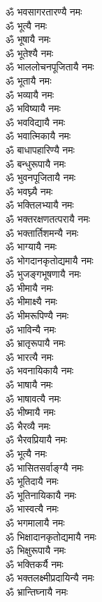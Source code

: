 \begin{flushleft}
\begin{multicols}{2}
ॐ भवसागरतारण्यै नमः\\
ॐ भूत्यै नमः\\
ॐ भूषायै नमः\hfill{}\\
ॐ भूतेश्यै नमः\\
ॐ भाललोचनपूजितायै नमः\\
ॐ भूतायै नमः\\
ॐ भव्यायै नमः\\
ॐ भविष्यायै नमः\\
ॐ भवविद्यायै नमः\\
ॐ भवात्मिकायै नमः\\
ॐ बाधापहारिण्यै नमः\\
ॐ बन्धुरूपायै नमः\\
ॐ भुवनपूजितायै नमः\hfill{}\\
ॐ भवघ्न्यै नमः\\
ॐ भक्तिलभ्यायै नमः\\
ॐ भक्तरक्षणतत्परायै नमः\\
ॐ भक्तार्तिशमन्यै नमः\\
ॐ भाग्यायै नमः\\
ॐ भोगदानकृतोद्यमायै नमः\\
ॐ भुजङ्गभूषणायै नमः\\
ॐ भीमायै नमः\\
ॐ भीमाक्ष्यै नमः\\
ॐ भीमरूपिण्यै नमः\hfill{}\\
ॐ भाविन्यै नमः\\
ॐ भ्रातृरूपायै नमः\\
ॐ भारत्यै नमः\\
ॐ भवनायिकायै नमः\\
ॐ भाषायै नमः\\
ॐ भाषावत्यै नमः\\
ॐ भीष्मायै नमः\\
ॐ भैरव्यै नमः\\
ॐ भैरवप्रियायै नमः\\
ॐ भूत्यै नमः\hfill{}\\
ॐ भासितसर्वाङ्ग्यै नमः\\
ॐ भूतिदायै नमः\\
ॐ भूतिनायिकायै नमः\\
ॐ भास्वत्यै नमः\\
ॐ भगमालायै नमः\\
ॐ भिक्षादानकृतोद्यमायै नमः\\
ॐ भिक्षुरूपायै नमः\\
ॐ भक्तिकर्यै नमः\\
ॐ भक्तलक्ष्मीप्रदायिन्यै नमः\\
ॐ भ्रान्तिघ्नायै नमः\hfill{}\\

\end{multicols}
\end{flushleft}
